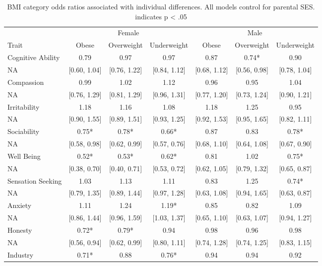 \documentclass[man]{apa6}
\makeatletter
\newcommand\LastLTentrywidth{1em}
\newlength\longtablewidth
\newcommand{\getlongtablewidth}{\begingroup \ifcsname LT@\roman{LT@tables}\endcsname \global\longtablewidth=0pt \renewcommand{\LT@entry}[2]{\global\advance\longtablewidth by ##2\relax\gdef\LastLTentrywidth{##2}}\@nameuse{LT@\roman{LT@tables}} \fi \endgroup}
\makeatother
\begin{document}
\begin{center}
\begin{ThreePartTable}
\small{
\begin{longtable}{lcccccc}\noalign{\getlongtablewidth\global\LTcapwidth=\longtablewidth}
\caption{\label{tab:tablepers}BMI category odds ratios associated with individual differences. All models control for parental SES. \* indicates p < .05}\\
\toprule
 & \multicolumn{3}{c}{Female} & \multicolumn{3}{c}{Male} \\
\cmidrule(r){2-4} \cmidrule(r){5-7}
Trait & Obese & Overweight & Underweight & Obese & Overweight & Underweight\\
\midrule
Cognitive Ability & 0.79 & 0.97 & 0.97 & 0.87 & 0.74* & 0.90\\
NA & [0.60, 1.04] & [0.76, 1.22] & [0.84, 1.12] & [0.68, 1.12] & [0.56, 0.98] & [0.78, 1.04]\\
Compassion & 0.99 & 1.02 & 1.12 & 0.96 & 0.95 & 1.04\\
NA & [0.76, 1.29] & [0.81, 1.29] & [0.96, 1.31] & [0.77, 1.20] & [0.73, 1.24] & [0.90, 1.21]\\
Irritability & 1.18 & 1.16 & 1.08 & 1.18 & 1.25 & 0.95\\
NA & [0.90, 1.55] & [0.89, 1.51] & [0.93, 1.25] & [0.92, 1.53] & [0.95, 1.65] & [0.82, 1.11]\\
Sociability & 0.75* & 0.78* & 0.66* & 0.87 & 0.83 & 0.78*\\
NA & [0.58, 0.98] & [0.62, 0.99] & [0.57, 0.76] & [0.68, 1.10] & [0.64, 1.08] & [0.67, 0.90]\\
Well Being & 0.52* & 0.53* & 0.62* & 0.81 & 1.02 & 0.75*\\
NA & [0.38, 0.70] & [0.40, 0.71] & [0.53, 0.72] & [0.62, 1.05] & [0.79, 1.32] & [0.65, 0.87]\\
Sensation Seeking & 1.03 & 1.13 & 1.11 & 0.83 & 1.25 & 0.74*\\
NA & [0.79, 1.35] & [0.89, 1.44] & [0.97, 1.28] & [0.63, 1.08] & [0.94, 1.65] & [0.63, 0.87]\\
Anxiety & 1.11 & 1.24 & 1.19* & 0.85 & 0.82 & 1.09\\
NA & [0.86, 1.44] & [0.96, 1.59] & [1.03, 1.37] & [0.65, 1.10] & [0.63, 1.07] & [0.94, 1.27]\\
Honesty & 0.72* & 0.79* & 0.94 & 0.98 & 0.96 & 0.98\\
NA & [0.56, 0.94] & [0.62, 0.99] & [0.80, 1.11] & [0.74, 1.28] & [0.74, 1.25] & [0.83, 1.15]\\
Industry & 0.71* & 0.88 & 0.76* & 0.94 & 0.94 & 0.92\\

\end{longtable}}
\end{ThreePartTable}
\end{center}
\end{document}
